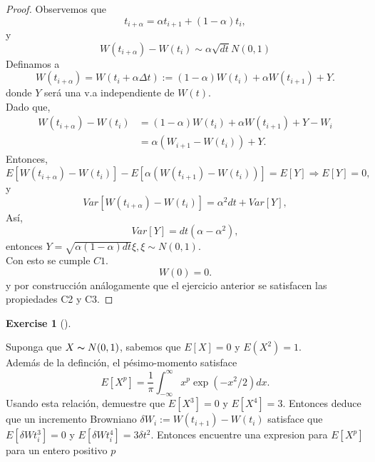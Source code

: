 \documentclass[
  letterpaper,
  DIV=11,
  numbers=noendperiod]{scrreprt}
\theoremstyle{plain}
\theoremstyle{definition}
\newtheorem{exercise}{Exercise}[chapter]
\theoremstyle{remark}
\begin{document}
\begin{proof}

Observemos que \[
t_{i+\alpha}=\alpha t_{i+1}+(1-\alpha)t_{i},
\] y \[
W(t_{i+\alpha})-W(t_{i}) \sim \alpha\sqrt{ dt}N(0,1)
\] Definamos a \[
W(t_{i+\alpha})=W\left(t_{i}+\alpha\Delta t\right) :=\left(1-\alpha\right)W(t_{i})+\alpha W(t_{i+1})+Y.
\] donde \(Y\) será una v.a independiente de \(W\left(t\right)\).\\
Dado que, \[
\begin{align*}
W(t_{i+\alpha})-W(t_{i}) & =\left(1-\alpha\right)W(t_{i})+\alpha W(t_{i+1})+Y-W_{i}\\
 & =\alpha\left(W_{i+1}-W(t_{i})\right)+Y.
\end{align*}
\] Entonces, \[
E\left[W(t_{i+\alpha})-W(t_{i})\right]-E[\alpha\left(W(t_{i+1})-W(t_{i})\right)]=E\left[Y\right]\Longrightarrow E[Y]=0,
\] y \[
Var\left[W(t_{i+\alpha})-W(t_{i})\right]=\alpha^{2}d t+Var\left[Y\right],
\] Así, \[
Var\left[Y\right]=d t\left(\alpha-\alpha^{2}\right),
\] entonces
\(Y=\sqrt{\alpha\left(1-\alpha\right)dt}\xi,\xi\sim N\left(0,1\right)\).\\
Con esto se cumple \(C1\). \[
W\left(0\right)=0.
\] y por construcción análogamente que el ejercicio anterior se
satisfacen las propiedades C2 y C3.

\end{proof}

\begin{exercise}[]\protect\hypertarget{exr-4}{}\label{exr-4}

Suponga que \(X\thicksim N(0,1)\), sabemos que \(E[X]=0\) y
\(E(X^{2})=1\).\\
Además de la definción, el pésimo-momento satisface \[
E[X^{p}]=\frac{1}{\pi}\int_{-\infty}^{\infty}x^{p}\exp(-x^{2}/2)dx.
\] Usando esta relación, demuestre que \(E[X^{3}]=0\) y \(E[X^{4}]=3\).
Entonces deduce que un incremento Browniano
\(\delta W_{i}:=W(t_{i+1})-W(t_{i})\) satisface que
\(E[\delta Wt_{i}^{3}]=0\) y \(E[\delta Wt_{i}^{4}]=3\delta t^{2}\).
Entonces encuentre una expresion para \(E[X^{p}]\) para un entero
positivo \(p\)

\end{exercise}
\end{document}
